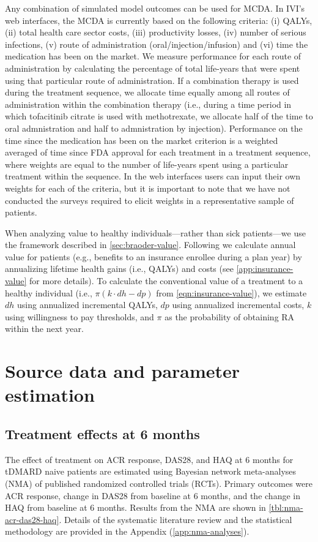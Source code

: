 \documentclass[11pt,final,fleqn]{article}\usepackage[]{graphicx}\usepackage[]{color}
\theoremstyle{plain}
\begin{document}
Any combination of simulated model outcomes can be used for MCDA. In IVI's web interfaces, the MCDA is currently based on the following criteria: (i) QALYs, (ii) total health care sector costs, (iii) productivity losses, (iv) number of serious infections, (v) route of administration (oral/injection/infusion) and (vi) time the medication has been on the market. We measure performance for each route of administration by calculating the percentage of total life-years that were spent using that particular route of administration. If a combination therapy is used during the treatment sequence, we allocate time equally among all routes of administration within the combination therapy (i.e., during a time period in which tofacitinib citrate is used with methotrexate, we allocate half of the time to oral admnistration and half to admnistration by injection). Performance on the time since the medication has been on the market criterion is a weighted averaged of time since FDA approval for each treatment in a treatment sequence, where weights are equal to the number of life-years spent using a particular treatment within the sequence. In the web interfaces users can input their own weights for each of the criteria, but it is important to note that we have not conducted the surveys required to elicit weights in a representative sample of patients. 

When analyzing value to healthy individuals---rather than sick patients---we use the framework described in \autoref{sec:braoder-value}. Following \citet{lakdawalla2015insurance} we calculate annual value for patients (e.g., benefits to an insurance enrollee during a plan year) by annualizing lifetime health gains (i.e., QALYs) and costs (see \autoref{app:insurance-value} for more details). To calculate the conventional value of a treatment to a healthy individual (i.e., $\pi( k \cdot dh - dp)$ from \autoref{eqn:insurance-value}), we estimate $dh$ using annualized incremental QALYs, $dp$ using annualized incremental costs, $k$ using willingness to pay thresholds, and $\pi$ as the probability of obtaining RA within the next year.  

\section{Source data and parameter estimation}\label{sec:data-parameters}

\subsection{Treatment effects at 6 months}\label{nma-parameters}
The effect of treatment on ACR response, DAS28, and HAQ at 6 months for tDMARD naive patients are estimated using Bayesian network meta-analyses (NMA) of published randomized controlled trials (RCTs). Primary outcomes were ACR response, change in DAS28 from baseline at 6 months, and the change in HAQ from baseline at 6 months. Results from the NMA are shown in \autoref{tbl:nma-acr-das28-haq}. Details of the systematic literature review and the statistical methodology are provided in the Appendix (\autoref{app:nma-analyses}).
\end{document}
